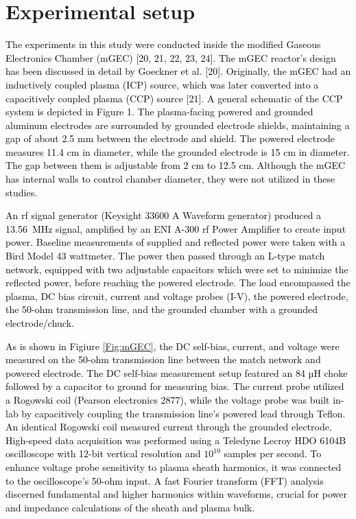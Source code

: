 \documentclass[12pt]{iopart}
\begin{document}
\section{Experimental setup}\label{Sect:ExpSetup}
\textcolor{black}{The experiments in this study were conducted inside the modified Gaseous Electronics Chamber (mGEC) [20, 21, 22, 23, 24]. The mGEC reactor's design has been discussed in detail by Goeckner et al. [20]. Originally, the mGEC had an inductively coupled plasma (ICP) source, which was later converted into a capacitively coupled plasma (CCP) source [21]. A general schematic of the CCP system is depicted in Figure 1. The plasma-facing powered and grounded aluminum electrodes are surrounded by grounded electrode shields, maintaining a gap of about 2.5 mm between the electrode and shield. The powered electrode measures 11.4 cm in diameter, while the grounded electrode is 15 cm in diameter. The gap between them is adjustable from 2 cm to 12.5 cm. Although the mGEC has internal walls to control chamber diameter, they were not utilized in these studies.}

\textcolor{black}{An rf signal generator (Keysight 33600 A Waveform generator) produced a \hbox{13.56 MHz} signal, amplified by an ENI A-300 rf Power Amplifier to create input power. Baseline measurements of supplied and reflected power were taken with a Bird Model 43 wattmeter. The power then passed through an L-type match network, equipped with two adjustable capacitors which were set to minimize the reflected power, before reaching the powered electrode. The load encompassed the plasma, DC bias circuit, current and voltage probes (I-V), the powered electrode, the 50-ohm transmission line, and the grounded chamber with a grounded electrode/chuck.}

\textcolor{black}{As is shown in Figiure \ref{Fig:mGEC}, the DC self-bias, current, and voltage were measured on the 50-ohm transmission line between the match network and powered electrode. The DC self-bias measurement setup featured an 84 µH choke followed by a capacitor to ground for measuring bias. The current probe utilized a Rogowski coil (Pearson electronics 2877), while the voltage probe was built in-lab by capacitively coupling the transmission line's powered lead through Teflon. An identical Rogowski coil measured current through the grounded electrode. High-speed data acquisition was performed using a Teledyne Lecroy HDO 6104B oscilloscope with 12-bit vertical resolution and $10^{10}$ samples per second. To enhance voltage probe sensitivity to plasma sheath harmonics, it was connected to the oscilloscope's 50-ohm input. A fast Fourier transform (FFT) analysis discerned fundamental and higher harmonics within waveforms, crucial for power and impedance calculations of the sheath and plasma bulk.}
\end{document}
